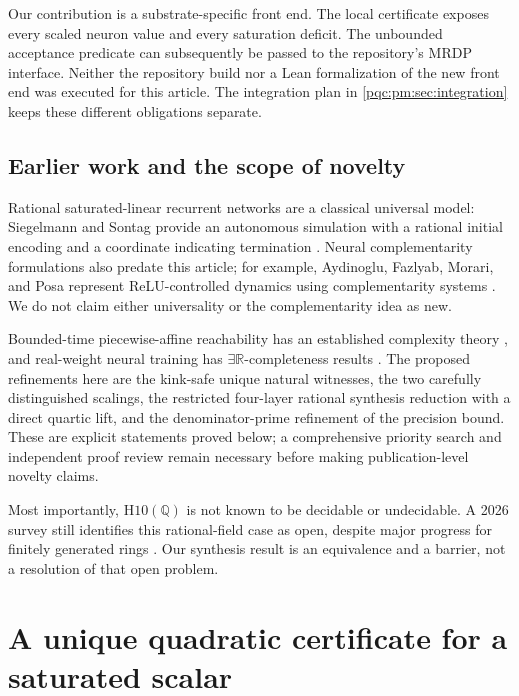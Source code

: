 \documentclass[11pt,letterpaper]{article}
\numberwithin{equation}{section}
\theoremstyle{definition}
\theoremstyle{remark}
\newcommand{\Q}{\mathbb Q}
\newcommand{\R}{\mathbb R}
\newcommand{\srcmark}[1]{\par\noindent{\small\itshape [source~#1]}\par}
\newcommand{\Hten}{\mathrm{H10}(\Q)}
\begin{document}
Our contribution is a substrate-specific front end. The local certificate
exposes every scaled neuron value and every saturation deficit. The unbounded
acceptance predicate can subsequently be passed to the repository's MRDP
interface. Neither the repository build nor a Lean formalization of the new
front end was executed for this article. The integration plan in
\cref{pqc:pm:sec:integration} keeps these different obligations separate.

\subsection{Earlier work and the scope of novelty}

Rational saturated-linear recurrent networks are a classical universal model:
Siegelmann and Sontag provide an autonomous simulation with a rational initial
encoding and a coordinate indicating termination \cite{b62s15-ss}. Neural
complementarity formulations also predate this article; for example,
Aydinoglu, Fazlyab, Morari, and Posa represent ReLU-controlled dynamics using
complementarity systems \cite{b62s15-complementarity}. We do not claim either
universality or the complementarity idea as new.

Bounded-time piecewise-affine reachability has an established complexity theory
\cite{b62s15-bounded-reachability}, and real-weight neural training has
$\exists\R$-completeness results \cite{b62s15-real-training}. The proposed refinements
here are the kink-safe unique natural witnesses, the two carefully distinguished
scalings, the restricted four-layer rational synthesis reduction with a direct
quartic lift, and the denominator-prime refinement of the precision bound.
These are explicit statements proved below; a comprehensive priority search
and independent proof review remain necessary before making publication-level
novelty claims.

Most importantly, $\Hten$ is not known to be decidable or undecidable. A 2026
survey still identifies this rational-field case as open, despite major progress
for finitely generated rings \cite[Question 6.2]{b62s15-koymans-pagano}. Our synthesis
result is an equivalence and a barrier, not a resolution of that open problem.

\section{A unique quadratic certificate for a saturated scalar}
\label{pqc:pm:sec:scalar}
\srcmark{15}
\end{document}
